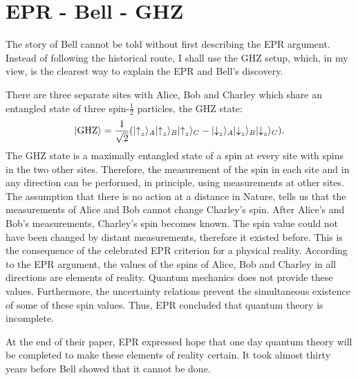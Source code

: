 \documentclass[12pt]{article}
\begin{document}
\section{EPR - Bell - GHZ }\label{E-B-G}

The story of Bell cannot be told without first describing the EPR argument. Instead of following the historical route,   I shall use the GHZ setup, which, in my view, is the clearest way to explain the EPR and Bell's discovery.

There are three separate sites with Alice, Bob and Charley which share an entangled state of three spin-$\frac{1}{2}$ particles, the GHZ state:
\begin{equation}
\label{GHZ}
|\mathrm{GHZ}\rangle = {1\over \sqrt
  2}{\Large (}|{\uparrow}_z\rangle_A|{\uparrow}_z\rangle_B|{\uparrow}_z\rangle_C -
|{\downarrow}_z\rangle_A|{\downarrow}_z\rangle_B|{\downarrow}_z\rangle_C{\Large
)} .
\end{equation}
The GHZ state is a maximally entangled state of a spin at every site with spins in the two other sites. Therefore, the measurement of the spin in each site and in any direction can be performed, in principle, using measurements at other sites. The assumption that there is no action at a distance in Nature, tells us that the measurements of Alice and Bob cannot change Charley's spin. After Alice's and Bob's measurements,  Charley's spin becomes known. The spin value could not have been changed by distant measurements, therefore it existed before. This is the consequence of the celebrated EPR criterion for a physical reality. According to the EPR argument, the values of the spins of Alice, Bob and Charley in all directions  are elements of reality. Quantum mechanics does not provide these values. Furthermore, the uncertainty relations prevent the simultaneous existence of some of these spin values. Thus, EPR concluded that quantum theory is incomplete.

 At the end of their paper, EPR expressed hope that one day quantum theory will be completed to make these elements of reality certain. It took almost thirty years before Bell showed that it cannot be done.
\end{document}

